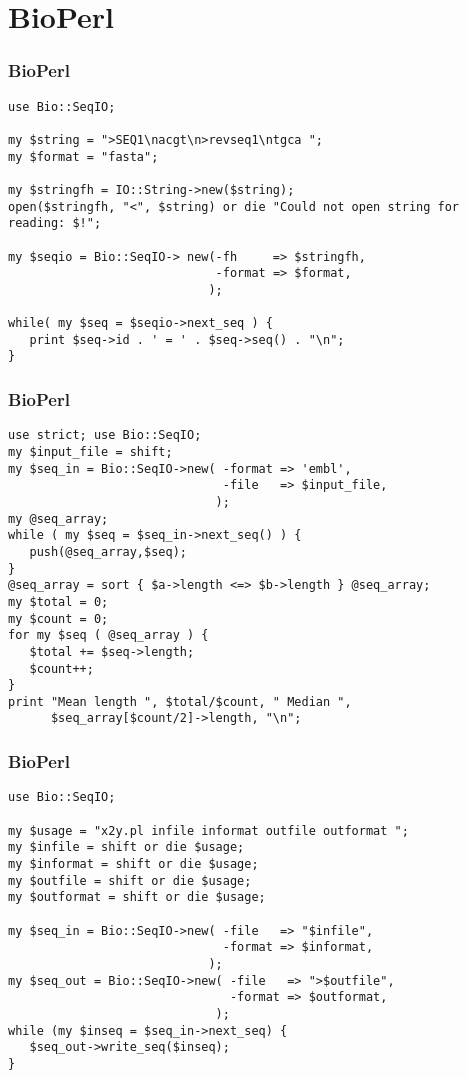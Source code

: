 \section{BioPerl}
\begin{frame}[fragile]
  \frametitle{BioPerl}
  \vspace{-1.5em}
\begin{lstlisting}[basicstyle=\footnotesize\tt,numberstyle=\scriptsize]
use Bio::SeqIO;

my $string = ">SEQ1\nacgt\n>revseq1\ntgca "; 
my $format = "fasta";

my $stringfh = IO::String->new($string); 
open($stringfh, "<", $string) or die "Could not open string for reading: $!";

my $seqio = Bio::SeqIO-> new(-fh     => $stringfh,
                             -format => $format,
                            );

while( my $seq = $seqio->next_seq ) {
   print $seq->id . ' = ' . $seq->seq() . "\n"; 
}
\end{lstlisting}
\end{frame}

\begin{frame}[fragile]
  \frametitle{BioPerl}
  \vspace{-1.5em}
\begin{lstlisting}[basicstyle=\footnotesize\tt,numberstyle=\scriptsize]
use strict; use Bio::SeqIO;
my $input_file = shift;
my $seq_in = Bio::SeqIO->new( -format => 'embl',
                              -file   => $input_file,
                             );
my @seq_array; 
while ( my $seq = $seq_in->next_seq() ) {
   push(@seq_array,$seq);
}
@seq_array = sort { $a->length <=> $b->length } @seq_array;
my $total = 0; 
my $count = 0; 
for my $seq ( @seq_array ) {
   $total += $seq->length;
   $count++;
}
print "Mean length ", $total/$count, " Median ", 
      $seq_array[$count/2]->length, "\n";
\end{lstlisting}
\end{frame}

\begin{frame}[fragile]
  \frametitle{BioPerl}
  \vspace{-1.5em}
\begin{lstlisting}[basicstyle=\footnotesize\tt,numberstyle=\scriptsize]
use Bio::SeqIO;

my $usage = "x2y.pl infile informat outfile outformat "; 
my $infile = shift or die $usage; 
my $informat = shift or die $usage; 
my $outfile = shift or die $usage; 
my $outformat = shift or die $usage;

my $seq_in = Bio::SeqIO->new( -file   => "$infile",
                              -format => $informat,
                            );
my $seq_out = Bio::SeqIO->new( -file   => ">$outfile",
                               -format => $outformat,
                             );
while (my $inseq = $seq_in->next_seq) {
   $seq_out->write_seq($inseq);
}
\end{lstlisting}
\end{frame}

